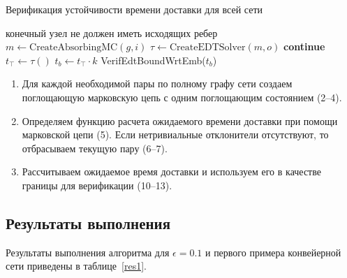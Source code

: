 \documentclass[a4paper]{article}
\begin{document}
\begin{listing}[H]
\caption{Верификация устойчивости времени доставки для всей сети}
\label{VerifEdtRobustnessWrtEmb}
\begin{algorithmic}[1]
        \State \Comment конечный узел не должен иметь исходящих ребер
        \State $m \gets \text{CreateAbsorbingMC}(g, i)$
        \State $\tau \gets \text{CreateEDTSolver}(m, o)$
            \State \textbf{continue}
        \EndIf
        \State
        \State $t_{\top} \gets \tau()$
            \State $t_b \gets t_{\top} \cdot k$
            \State VerifEdtBoundWrtEmb($t_b$)
        \EndFor
    \EndFor
\EndProcedure
\end{algorithmic}
\end{listing}

\begin{enumerate}
    \item Для каждой необходимой пары по полному графу сети создаем поглощающую
        марковскую цепь с одним поглощающим состоянием (2--4).
    \item Определяем функцию расчета ожидаемого времени доставки при помощи
        марковской цепи (5). Если нетривиальные отклонители отсутствуют, то
        отбрасываем текущую пару (6--7).
    \item Рассчитываем ожидаемое время доставки и используем его в качестве
        границы для верификации (10--13).
\end{enumerate}

\subsection{Результаты выполнения}

Результаты выполнения алгоритма для $\epsilon = 0.1$ и первого примера
конвейерной сети приведены в таблице~\ref{res1}.
\end{document}
